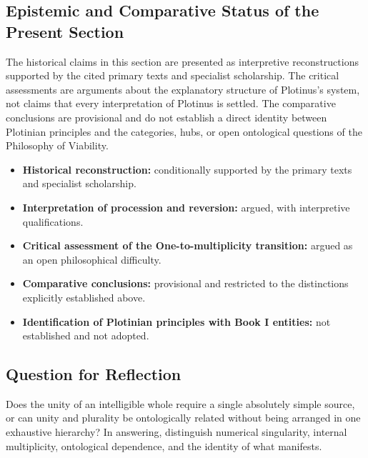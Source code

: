 \subsection*{Epistemic and Comparative Status of the Present Section}

The historical claims in this section are presented as
interpretive reconstructions supported by the cited primary
texts and specialist scholarship. The critical assessments are
arguments about the explanatory structure of Plotinus's system,
not claims that every interpretation of Plotinus is settled.
The comparative conclusions are provisional and do not establish
a direct identity between Plotinian principles and the categories,
hubs, or open ontological questions of the Philosophy of Viability.

\begin{itemize}
    \item \textbf{Historical reconstruction:} conditionally supported
    by the primary texts and specialist scholarship.
    \item \textbf{Interpretation of procession and reversion:}
    argued, with interpretive qualifications.
    \item \textbf{Critical assessment of the One-to-multiplicity
    transition:} argued as an open philosophical difficulty.
    \item \textbf{Comparative conclusions:} provisional and
    restricted to the distinctions explicitly established above.
    \item \textbf{Identification of Plotinian principles with
    Book I entities:} not established and not adopted.
\end{itemize}

\subsection*{Question for Reflection}

Does the unity of an intelligible whole require a single absolutely
simple source, or can unity and plurality be ontologically related
without being arranged in one exhaustive hierarchy? In answering,
distinguish numerical singularity, internal multiplicity, ontological
dependence, and the identity of what manifests.

